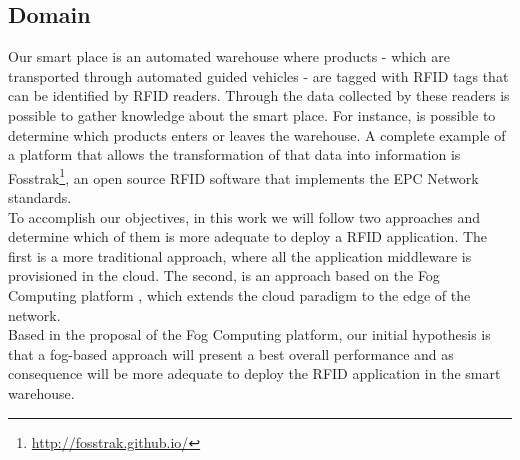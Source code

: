 \subsection{Domain}
\label{sub:domain}
Our smart place is an automated warehouse where products - which are transported through automated
guided vehicles - are tagged with \gls{RFID} tags that can be identified by \gls{RFID} readers.
Through the data collected by these readers is possible to gather knowledge about the smart place.
For instance, is possible to determine which products enters or leaves the warehouse. A complete example
of a platform that allows the transformation of that data into information is Fosstrak\footnote{\url{http://fosstrak.github.io/}},
an open source \gls{RFID} software that implements the \gls{EPC} Network standards.\\

To accomplish our objectives, in this work we will follow two approaches and determine which of them
is more adequate to deploy a \gls{RFID} application. The first is a more traditional approach, where
all the application middleware is provisioned in the cloud. The second, is an approach based on the
Fog Computing platform \cite{bonomi2012fog}, which extends the cloud paradigm to the edge of the
network.\\

Based in the proposal of the Fog Computing platform, our initial hypothesis is that a fog-based approach
will present a best overall performance and as consequence will be more adequate to deploy the \gls{RFID}
application in the smart warehouse. 

